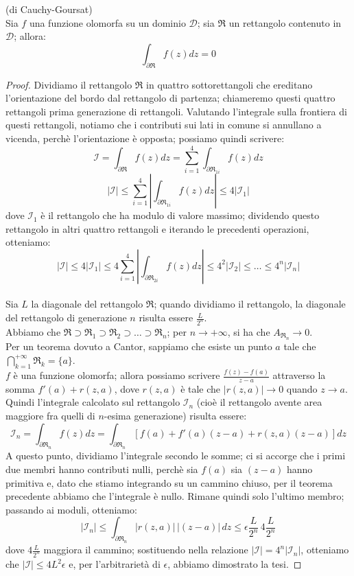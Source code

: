 \begin{teorema}(di Cauchy-Goursat)\\Sia $f$ una funzione olomorfa su un dominio $\mathcal{D}$; sia $\mathfrak{R}$ un rettangolo contenuto in $\mathcal{D}$; allora:
$$\int_{\partial \mathfrak{R}} f(z)dz=0$$
\end{teorema}
\begin{proof}
Dividiamo il rettangolo $\mathfrak{R}$ in quattro sottorettangoli che ereditano l'orientazione del bordo dal rettangolo di partenza; chiameremo questi quattro rettangoli prima generazione di rettangoli. Valutando l'integrale sulla frontiera di questi rettangoli, notiamo che i contributi sui lati in comune si annullano a vicenda, perchè l'orientazione è opposta; possiamo quindi scrivere:
$$\mathcal{I}=\int_{\partial \mathfrak{R}} f(z)dz=\sum_{i=1} ^4 \int_{\partial \mathfrak{R}_{1i}} f(z)dz$$
$$|\mathcal{I}| \leq \sum_{i=1} ^4 \left|\int_{\partial \mathfrak{R}_{1i}} f(z)dz \right| \leq 4|\mathcal{I}_1|$$ dove $\mathcal{I}_1$ è il rettangolo che ha modulo di valore massimo; dividendo questo rettangolo in altri quattro rettangoli e iterando le precedenti operazioni, otteniamo:
$$|\mathcal{I}| \leq 4|\mathcal{I}_1| \leq 4 \sum_{i=1} ^4\left|\int_{\partial \mathfrak{R}_{2i}} f(z)dz \right| \leq 4^2|\mathcal{I}_2| \leq \dots \leq 4^n |\mathcal{I}_n|$$
\\
Sia $L$ la diagonale del rettangolo $\mathfrak{R}$; quando dividiamo il rettangolo, la diagonale del rettangolo di generazione $n$ risulta essere $\frac{L}{2^n}$. \\ Abbiamo che $\mathfrak{R} \supset \mathfrak{R}_1 \supset \mathfrak{R}_2 \supset \dots \supset \mathfrak{R}_n$; per $n \to +\infty$, si ha che  $A_{\mathfrak{R}_n} \to 0$. \\Per un teorema dovuto a Cantor, sappiamo che esiste un punto $a$ tale che $\bigcap_{k=1} ^{+ \infty} \mathfrak{R}_k =\{a\}$.\\$f$ è una funzione olomorfa; allora possiamo scrivere $\frac{f(z)-f(a)}{z-a}$ attraverso la somma $f'(a)+r(z,a)$, dove $r(z,a)$ è tale che $|r(z,a)| \to 0$ quando $z \to a$. Quindi l'integrale calcolato sul rettangolo $\mathcal{I}_n$ (cioè il rettangolo avente area maggiore fra quelli di $n$-esima generazione) risulta essere:
$$\mathcal{I}_n= \int_{\partial \mathfrak{R}_n} f(z)dz = \int_{\partial \mathfrak{R}_n} [f(a)+f'(a)(z-a) + r(z,a)(z-a)]dz$$ A questo punto, dividiamo l'integrale secondo le somme; ci si accorge  che i primi due membri hanno contributi nulli, perchè sia $f(a)$ sia $(z-a)$ hanno primitiva e, dato che stiamo integrando su un cammino chiuso, per il teorema precedente abbiamo che l'integrale è nullo. Rimane quindi solo l'ultimo membro; passando ai moduli, otteniamo:
$$|\mathcal{I}_n|\leq \int_{\partial \mathfrak{R}_n} |r(z,a)| \, |(z-a)| \, dz \leq \epsilon \frac{L}{2^n} \, 4 \frac{L}{2^n}$$ dove $4 \frac{L}{2^n}$ maggiora il cammino; sostituendo nella relazione $|\mathcal{I}|=4^n |\mathcal{I}_n|$, otteniamo che $|\mathcal{I}| \leq 4 L^2 \epsilon$ e, per l'arbitrarietà di $\epsilon$, abbiamo dimostrato la tesi.
\end{proof}
